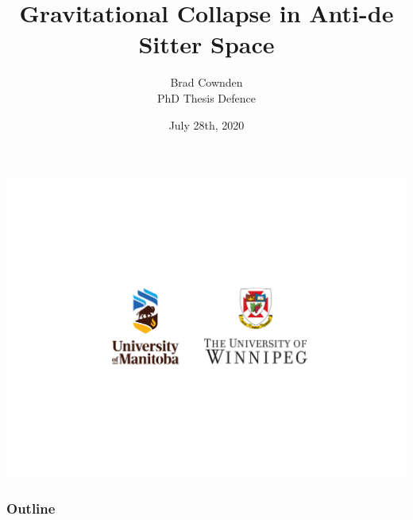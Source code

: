 \documentclass[mathserif,10pt]{beamer}
\title[Gravitational Collapse in AdS]{Gravitational Collapse in Anti-de Sitter Space}
\author[Brad Cownden]{Brad Cownden \\ PhD Thesis Defence}
\date[July 28th, 2020]{July 28th, 2020}
\begin{document}

\frame
{
   \titlepage
   \begin{center}
   \includegraphics[scale=0.25]{newlogos}
   \end{center}
}

\frame
{
  \frametitle{Outline}
  \tableofcontents
}
\end{document}
